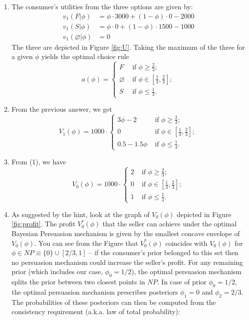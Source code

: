 \documentclass[a4paper]{article}
\begin{document}
	\begin{enumerate}
		\item The consumer's utilities from the three options are given by:
		\begin{align*}
			v_1(F|\phi) &= \phi \cdot 3000 + (1-\phi) \cdot 0 - 2000 \\
			v_1(S|\phi) &= \phi \cdot 0 + (1-\phi) \cdot 1500 - 1000 \\
			v_1(\varnothing|\phi) &= 0
		\end{align*}
		The three are depicted in Figure \ref{fig:U}.
		Taking the maximum of the three for a given $\phi$ yields the optimal choice rule
		\begin{equation*}
			a(\phi) = 
			\begin{cases}
				F & \text{ if } \phi \geq \frac{2}{3}; \\
				\varnothing & \text{ if } \phi \in \left[ \frac{1}{3}, \frac{2}{3} \right]; \\
				S & \text{ if } \phi \leq \frac{1}{3}.
			\end{cases}
		\end{equation*}
		\item From the previous answer, we get
		\begin{equation*}
			V_1(\phi) = 1000 \cdot 
			\begin{cases}
				3\phi - 2 & \text{ if } \phi \geq \frac{2}{3}; \\
				0 & \text{ if } \phi \in \left[ \frac{1}{3}, \frac{2}{3} \right]; \\
				0.5 - 1.5\phi & \text{ if } \phi \leq \frac{1}{3}.
			\end{cases}
		\end{equation*}
		\item From (1), we have
		\begin{equation*}
			V_0(\phi) = 1000 \cdot 
			\begin{cases}
				2 & \text{ if } \phi \geq \frac{2}{3}; \\
				0 & \text{ if } \phi \in \left[ \frac{1}{3}, \frac{2}{3} \right]; \\
				1 & \text{ if } \phi \leq \frac{1}{3}.
			\end{cases}
		\end{equation*}
		\item As suggested by the hint, look at the graph of $V_0(\phi)$ depicted in Figure \ref{fig:profit}.
		The profit $V_0^*(\phi)$ that the seller can achieve under the optimal Bayesian Persuasion mechanism is given by the smallest concave envelope of $V_0(\phi)$. You can see from the Figure that $V_0^*(\phi)$ coincides with $V_0(\phi)$ for $\phi \in NP \equiv \{0\} \cup [2/3,1]$ -- if the consumer's prior belonged to this set then no persuasion mechanism could increase the seller's profit. For any remaining prior (which includes our case, $\phi_0=1/2$), the optimal persuasion mechanism splits the prior between two closest points in $NP$. In case of prior $\phi_0 = 1/2$, the optimal persuasion mechanism prescribes posteriors $\phi_1 = 0$ and $\phi_2 = 2/3$. The probabilities of these posteriors can then be computed from the consistency requirement (a.k.a. law of total probability):

\end{enumerate}
\end{document}
